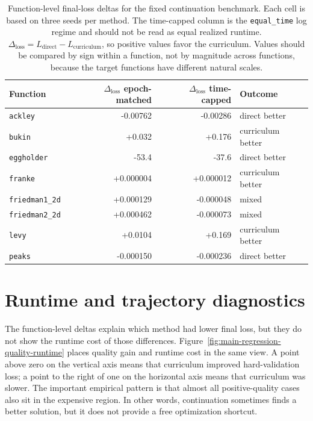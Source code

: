 \documentclass[english,master,a4paper,oneside]{ppfcmthesis}
\begin{document}
\begin{table}[htbp]
\centering
\small
\begin{tabular}{lrrl}
\toprule
Function & \(\Delta_{\mathrm{loss}}\) epoch-matched & \(\Delta_{\mathrm{loss}}\) time-capped & Outcome \\
\midrule
\texttt{ackley} & -0.00762 & -0.00286 & direct better \\
\texttt{bukin} & +0.032 & +0.176 & curriculum better \\
\texttt{eggholder} & -53.4 & -37.6 & direct better \\
\texttt{franke} & +0.000004 & +0.000012 & curriculum better \\
\texttt{friedman1\_2d} & +0.000129 & -0.000048 & mixed \\
\texttt{friedman2\_2d} & +0.000462 & -0.000073 & mixed \\
\texttt{levy} & +0.0104 & +0.169 & curriculum better \\
\texttt{peaks} & -0.000150 & -0.000236 & direct better \\
\bottomrule
\end{tabular}
\caption{Function-level final-loss deltas for the fixed continuation benchmark.
Each cell is based on three seeds per method. The time-capped column is the
\texttt{equal\_time} log regime and should not be read as equal realized
runtime. \(\Delta_{\mathrm{loss}}=L_{\mathrm{direct}}-L_{\mathrm{curriculum}}\), so
positive values favor the curriculum. Values should be compared by sign within a
function, not by magnitude across functions, because the target functions have
different natural scales.}
\label{tab:main-regression-function-deltas}
\end{table}

\section{Runtime and trajectory diagnostics}

The function-level deltas explain which method had lower final loss, but they do
not show the runtime cost of those differences. Figure~\ref{fig:main-regression-quality-runtime}
places quality gain and runtime cost in the same view. A point above zero on the
vertical axis means that curriculum improved hard-validation loss; a point to
the right of one on the horizontal axis means that curriculum was slower. The
important empirical pattern is that almost all positive-quality cases also sit
in the expensive region. In other words, continuation sometimes finds a better
solution, but it does not provide a free optimization shortcut.
\end{document}
